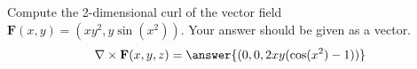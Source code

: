 \begin{problem}
Compute the 2-dimensional curl of the vector field $\mathbf{F}(x,y) = (xy^2,y\sin(x^2))$. Your answer should be given as a vector.
\[
\nabla\times\mathbf{F}(x,y,z) = \answer{(0,0,2xy(\cos(x^2)-1))}
\]
\end{problem}